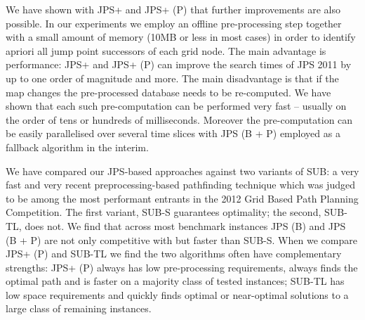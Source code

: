 We have shown with JPS+ and JPS+ (P) that further improvements are also possible. 
In our experiments we employ an offline pre-processing step together with a small 
amount of memory (10MB or less in most cases) in order to identify apriori all jump 
point successors of each grid node.
The main advantage is performance: JPS+ and JPS+ (P) can improve the search times of 
JPS 2011 by up to one order of magnitude and more.
The main disadvantage is that if the map changes the pre-processed
database needs to be re-computed. We have shown that each such pre-computation
can be performed very fast -- usually on the order of tens or hundreds of 
milliseconds. Moreover the pre-computation can be easily parallelised over
several time slices with JPS (B + P) employed as a fallback algorithm in
the interim.

We have compared our JPS-based approaches against two variants of SUB: a very fast 
and very recent preprocessing-based pathfinding technique which was judged to be 
among the most performant entrants in the 2012 Grid Based Path Planning Competition. 
The first variant, SUB-S guarantees optimality; the second, SUB-TL, does not. 
We find that across most benchmark instances JPS (B) and 
JPS (B + P) are not only competitive with but faster than SUB-S. When we compare
JPS+ (P) and SUB-TL we find the two algorithms often have complementary strengths:
JPS+ (P) always has low pre-processing requirements, always finds the optimal path
and is faster on a majority class of tested instances; SUB-TL has low space
requirements and quickly finds optimal or near-optimal solutions to a large class 
of remaining instances.

